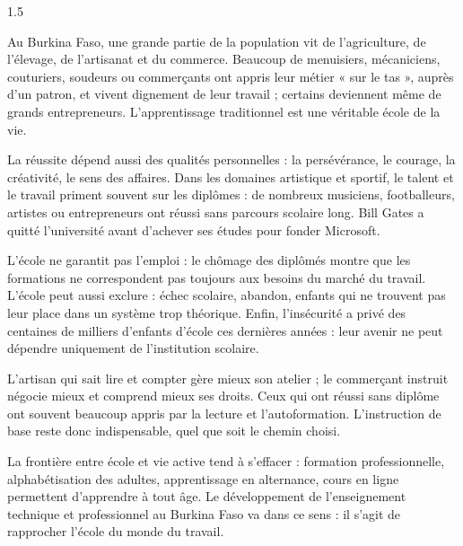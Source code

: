 \documentclass[12pt]{article}
\begin{document}
\begin{spacing}{1.5}

Au Burkina Faso, une grande partie de la population vit de l'agriculture, de l'élevage, de l'artisanat et du commerce. Beaucoup de menuisiers, mécaniciens, couturiers, soudeurs ou commerçants ont appris leur métier « sur le tas », auprès d'un patron, et vivent dignement de leur travail ; certains deviennent même de grands entrepreneurs. L'apprentissage traditionnel est une véritable école de la vie.

La réussite dépend aussi des qualités personnelles : la persévérance, le courage, la créativité, le sens des affaires. Dans les domaines artistique et sportif, le talent et le travail priment souvent sur les diplômes : de nombreux musiciens, footballeurs, artistes ou entrepreneurs ont réussi sans parcours scolaire long. Bill Gates a quitté l'université avant d'achever ses études pour fonder Microsoft.

L'école ne garantit pas l'emploi : le chômage des diplômés montre que les formations ne correspondent pas toujours aux besoins du marché du travail. L'école peut aussi exclure : échec scolaire, abandon, enfants qui ne trouvent pas leur place dans un système trop théorique. Enfin, l'insécurité a privé des centaines de milliers d'enfants d'école ces dernières années : leur avenir ne peut dépendre uniquement de l'institution scolaire.



L'artisan qui sait lire et compter gère mieux son atelier ; le commerçant instruit négocie mieux et comprend mieux ses droits. Ceux qui ont réussi sans diplôme ont souvent beaucoup appris par la lecture et l'autoformation. L'instruction de base reste donc indispensable, quel que soit le chemin choisi.

La frontière entre école et vie active tend à s'effacer : formation professionnelle, alphabétisation des adultes, apprentissage en alternance, cours en ligne permettent d'apprendre à tout âge. Le développement de l'enseignement technique et professionnel au Burkina Faso va dans ce sens : il s'agit de rapprocher l'école du monde du travail.


\end{spacing}
\end{document}
